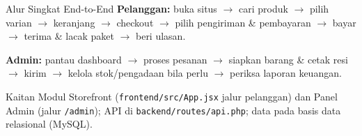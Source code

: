 
\begin{flowsection}{Alur Singkat End-to-End}
\textbf{Pelanggan:} buka situs $\rightarrow$ cari produk $\rightarrow$ pilih varian
$\rightarrow$ keranjang $\rightarrow$ checkout $\rightarrow$ pilih pengiriman \&
pembayaran $\rightarrow$ bayar $\rightarrow$ terima \& lacak paket $\rightarrow$
beri ulasan.

\textbf{Admin:} pantau dashboard $\rightarrow$ proses pesanan $\rightarrow$ siapkan
barang \& cetak resi $\rightarrow$ kirim $\rightarrow$ kelola stok/pengadaan bila
perlu $\rightarrow$ periksa laporan keuangan.
\end{flowsection}

\begin{flowsection}{Kaitan Modul}
Storefront (\texttt{frontend/src/App.jsx} jalur pelanggan) dan Panel Admin
(jalur \texttt{/admin}); API di \texttt{backend/routes/api.php}; data pada basis
data relasional (MySQL).
\end{flowsection}

